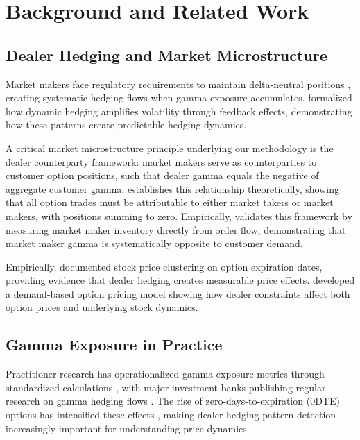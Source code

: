 \section{Background and Related Work}

\subsection{Dealer Hedging and Market Microstructure}

Market makers face regulatory requirements to maintain delta-neutral positions \cite{sec15c31}, creating systematic hedging flows when gamma exposure accumulates. \cite{frey1997market} formalized how dynamic hedging amplifies volatility through feedback effects, demonstrating how these patterns create predictable hedging dynamics.

A critical market microstructure principle underlying our methodology is the dealer counterparty framework: market makers serve as counterparties to customer option positions, such that dealer gamma equals the negative of aggregate customer gamma. \cite{anderegg2022impact} establishes this relationship theoretically, showing that all option trades must be attributable to either market takers or market makers, with positions summing to zero. Empirically, \cite{dim2025zero} validates this framework by measuring market maker inventory directly from order flow, demonstrating that market maker gamma is systematically opposite to customer demand.

Empirically, \cite{ni2005stock} documented stock price clustering on option expiration dates, providing evidence that dealer hedging creates measurable price effects. \cite{garleanu2009demand} developed a demand-based option pricing model showing how dealer constraints affect both option prices and underlying stock dynamics.

\subsection{Gamma Exposure in Practice}
Practitioner research has operationalized gamma exposure metrics through standardized calculations \cite{spotgamma2019,spotgamma2021}, with major investment banks publishing regular research on gamma hedging flows \cite{nomura2017}. The rise of zero-days-to-expiration (0DTE) options has intensified these effects \cite{cboe2023,jpmorgan2023}, making dealer hedging pattern detection increasingly important for understanding price dynamics.

